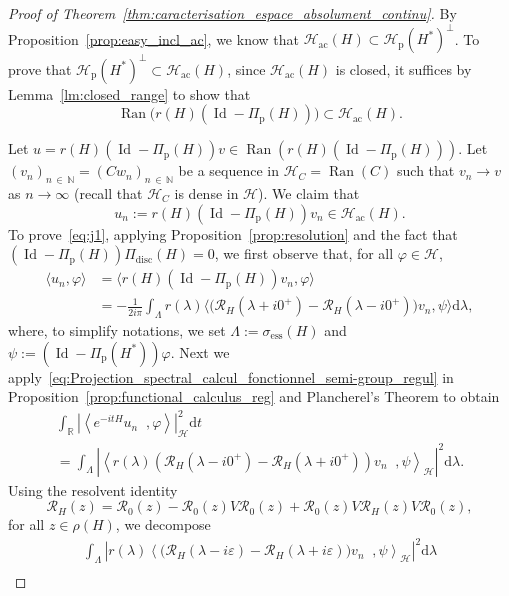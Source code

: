 \documentclass[AHL,Unicode,longabstracts,published]{cedram}
\newcommand{\Hi}{\mathcal{H}}
\newcommand{\R}{\mathbb{R}}
\newcommand{\N}{\mathbb{N}}
\newcommand{\ess}{\mathrm{ess}}
\newcommand{\rmp}{\mathrm{p}}
\newcommand{\acr}{\mathrm{ac}}
\newcommand{\rmd}{\mathrm{d}}
\newcommand{\disc}{\mathrm{disc}}
\newcommand{\scal}[2]{\left\langle{#1} \middle., {#2}\right\rangle}
\newcommand{\abso}[1]{\left|{#1}\right|}
\newcommand{\Res}{\mathcal{R}}
\DeclareMathOperator{\Ran}{Ran}
\DeclareMathOperator{\Id}{Id}
\newcommand{\Hi}{\mathcal{H}}
\newcommand{\rmp}{\mathrm{p}}
\newcommand{\R}{\mathbb{R}}
\newcommand{\ess}{\mathrm{ess}}
\newcommand{\acr}{\mathrm{ac}}
\begin{document}
\begin{proof}[Proof of Theorem~\ref{thm:caracterisation_espace_absolument_continu}]
By Proposition~\ref{prop:easy_incl_ac}, we know that $\Hi_\acr(H)\subset\Hi_\rmp(H^*)^\perp$. To prove that $\Hi_\rmp(H^*)^\perp\subset\Hi_\acr(H)$, since $\Hi_\acr(H)$ is closed, it suffices by Lemma~\ref{lm:closed_range} to show that
\begin{equation*}
\Ran\big(r(H)\left(\Id-\Pi_\rmp(H)\right)\big)\subset\Hi_\acr(H).
\end{equation*}

Let $u=r(H)(\Id-\Pi_\rmp(H))v \in \Ran(r(H)(\Id-\Pi_\rmp(H)))$. Let $(v_n)_{n\,\in\,\N}=(Cw_n)_{n\,\in\,\N}$ be a sequence in $\Hi_C=\Ran(C)$ such that $v_n\to v$ as $n\to\infty$ (recall that $\Hi_C$ is dense in $\Hi$). We claim that
\begin{equation}\label{eq:j1}
u_n:=r(H)\left(\Id-\Pi_{\rmp}(H)\right)v_n\in\Hi_\acr(H).
\end{equation}
To prove~\eqref{eq:j1}, applying Proposition~\ref{prop:resolution} and the fact that $(\Id-\Pi_{\rmp}(H))\Pi_{\disc}(H)=0$, we first observe that, for all $\varphi\in\Hi$,
\begin{align*}
\langle u_n,\varphi\rangle&=\big\langle r(H)\left(\Id-\Pi_{\rmp}(H)\right)v_n,\varphi\big\rangle\\
&=-\frac{1}{2i\pi}\int_{\Lambda}r(\lambda)\big\langle\big(\Res_{H}\left(\lambda+i0^+\right)-\Res_{H}\left(\lambda-i0^+\right)\big)v_n,\psi\big\rangle\rmd \lambda,
\end{align*}
where, to simplify notations, we set $\Lambda:=\sigma_{\ess}(H)$ and $\psi:=(\Id-\Pi_{\rmp}(H^*))\varphi$. Next we apply~\eqref{eq:Projection_spectral_calcul_fonctionnel_semi-group_regul} in Proposition~\ref{prop:functional_calculus_reg} and Plancherel's Theorem to obtain
\begin{multline}\label{eq:t1}
\int_\R\abso{\scal{e^{-itH}u_n}{\varphi}}_\Hi^2\rmd t\\
=\int_{\Lambda}\abso{\scal{r(\lambda)\left(\Res_H\left(\lambda-i0^+\right)-\Res_H\left(\lambda+i0^+\right)\right)v_n}{\psi}_\Hi}^2\rmd \lambda. 
\end{multline}
Using the resolvent identity
\begin{equation*}
\Res_H(z)=\Res_0(z)-\Res_0(z)V\Res_0(z)+\Res_0(z)V\Res_H(z)V\Res_0(z),
\end{equation*}
for all $z\in\rho(H)$, we decompose
\begin{multline}\label{eq:carac-ses_abso_eq_géné}
\int_{\Lambda}\abso{r(\lambda)\scal{\big(\Res_H(\lambda-i\varepsilon)-\Res_H(\lambda+i\varepsilon)\big)v_n}{\psi}_\Hi}^2\rmd \lambda\\

\end{multline}
\end{proof}
\end{document}
